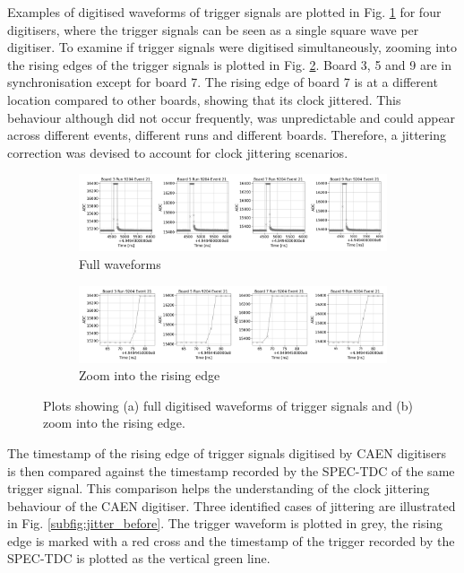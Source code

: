 Examples of digitised waveforms of trigger signals are plotted in Fig. \ref{fig:full_wfm} for four digitisers, where the trigger signals can be seen as a single square wave per digitiser.
To examine if trigger signals were digitised simultaneously, zooming into the rising edges of the trigger signals is plotted in Fig. \ref{fig:zoom_edge}.
Board 3, 5 and 9 are in synchronisation except for board 7.
The rising edge of board 7 is at a different location compared to other boards, showing that its clock jittered.
This behaviour although did not occur frequently, was unpredictable and could appear across different events, different runs and different boards. 
Therefore, a jittering correction was devised to account for clock jittering scenarios.

\begin{figure}[ht!]
\begin{subfigure}[h]{1.00\linewidth}
\centering    
\includegraphics[width=\linewidth]{jitter_before_unzoom}
\caption{Full waveforms}
\label{fig:full_wfm}
\end{subfigure}
\vspace{0.5cm}
\begin{subfigure}[h]{1.00\linewidth}
\centering    
\includegraphics[width=\linewidth]{jitter_before_zoom}
\caption{Zoom into the rising edge}
\label{fig:zoom_edge}
\end{subfigure}%

\caption[Clock Jitterin Cases]{
Plots showing (a) full digitised waveforms of trigger signals and (b) zoom into the rising edge.
}
\label{fig:trig_wfm}
\end{figure}


The timestamp of the rising edge of trigger signals digitised by CAEN digitisers is then compared against the timestamp recorded by the SPEC-TDC of the same trigger signal.
This comparison helps the understanding of the clock jittering behaviour of the CAEN digitiser. 
Three identified cases of jittering are illustrated in Fig. \ref{subfig:jitter_before}.
The trigger waveform is plotted in grey, the rising edge is marked with a red cross and the timestamp of the trigger recorded by the SPEC-TDC is plotted as the vertical green line.

